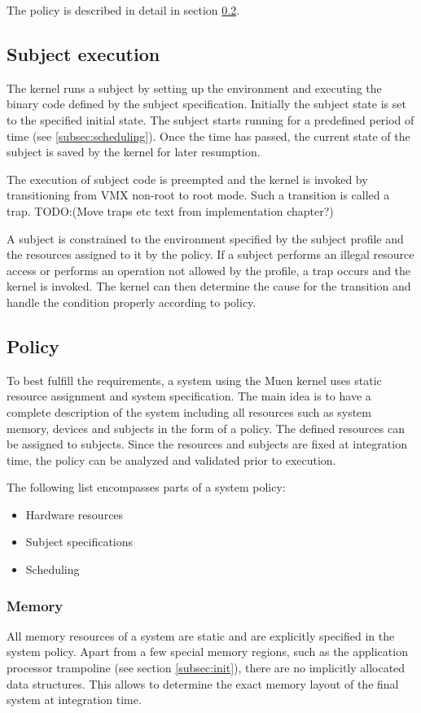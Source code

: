 The policy is described in detail in section \ref{subsec:policy}.

\subsection{Subject execution}
The kernel runs a subject by setting up the environment and executing the binary
code defined by the subject specification. Initially the subject state is set to
the specified initial state. The subject starts running for a predefined period
of time (see \ref{subsec:scheduling}). Once the time has passed, the current
state of the subject is saved by the kernel for later resumption.

The execution of subject code is preempted and the kernel is invoked by
transitioning from VMX non-root to root mode. Such a transition is called a
trap. TODO:(Move traps etc text from implementation chapter?)

A subject is constrained to the environment specified by the subject profile and
the resources assigned to it by the policy. If a subject performs an illegal
resource access or performs an operation not allowed by the profile, a trap
occurs and the kernel is invoked. The kernel can then determine the cause for
the transition and handle the condition properly according to policy.

\subsection{Policy}\label{subsec:policy}
To best fulfill the requirements, a system using the Muen kernel uses static
resource assignment and system specification. The main idea is to have a
complete description of the system including all resources such as system
memory, devices and subjects in the form of a policy. The defined resources can
be assigned to subjects. Since the resources and subjects are fixed at
integration time, the policy can be analyzed and validated prior to execution.

The following list encompasses parts of a system policy:
\begin{itemize}
	\item Hardware resources
	\item Subject specifications
	\item Scheduling
\end{itemize}

\subsubsection{Memory}
All memory resources of a system are static and are explicitly specified in the
system policy. Apart from a few special memory regions, such as the application
processor trampoline (see section \ref{subsec:init}), there are no implicitly
allocated data structures. This allows to determine the exact memory layout of
the final system at integration time.

